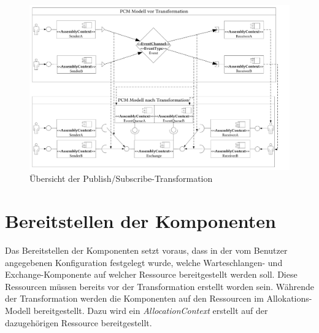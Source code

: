 \begin{figure}
\center
  \includegraphics[width=1.4\textwidth, angle=90]{images/transformation/transformationSystemPubSub.pdf}
  \caption{Übersicht der Publish/Subscribe-Transformation}
  \label{img:transformationPubSub}
\end{figure}


\section{Bereitstellen der Komponenten}
Das Bereitstellen der Komponenten setzt voraus, dass in der vom Benutzer angegebenen Konfiguration festgelegt wurde, welche Warteschlangen- und Exchange-Komponente auf welcher Ressource bereitgestellt werden soll. Diese Ressourcen müssen bereits vor der Transformation erstellt worden sein. Währende der Transformation werden die Komponenten auf den Ressourcen im Allokations-Modell bereitgestellt. Dazu wird ein \emph{AllocationContext} erstellt auf der dazugehörigen Ressource bereitgestellt.

